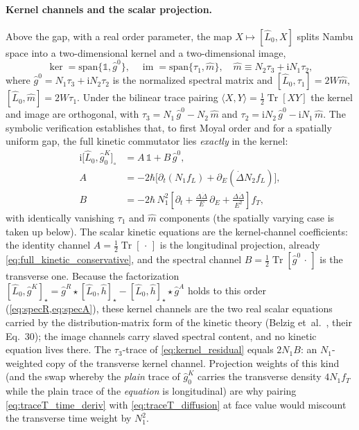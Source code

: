 \documentclass[
  aps,
  prb,
  preprint,
  superscriptaddress,
  longbibliography,
  nofootinbib
]{revtex4-2}
\newcommand{\ii}{\mathrm{i}}
\newcommand{\Tr}{\operatorname{Tr}}
\newcommand{\DOS}{N_1}
\newcommand{\fL}{f_L}
\newcommand{\fT}{f_T}
\newcommand{\hatg}{\hat{g}}
\providecommand{\openone}{}\renewcommand{\openone}{\mathds{1}}
\begin{document}
\paragraph{Kernel channels and the scalar projection.}
Above the gap, with a real order parameter, the map
\(X\mapsto[\hat L_0,X]\) splits Nambu space into a two-dimensional kernel
and a two-dimensional image,
\begin{equation}
  \ker=\mathrm{span}\{\openone,\hatg^0\},
  \quad
  \operatorname{im}=\mathrm{span}\{\tau_1,\hat m\},
  \quad
  \hat m\equiv N_2\tau_3+\ii\DOS\tau_2,
  \label{eq:kernel_channels}
\end{equation}
where \(\hatg^0=\DOS\tau_3+\ii N_2\tau_2\) is the normalized spectral
matrix and \([\hat L_0,\tau_1]=2W\hat m\), \([\hat L_0,\hat m]=2W\tau_1\).
Under the bilinear trace pairing \(\langle X,Y\rangle=\tfrac12\Tr[XY]\)
the kernel and image are orthogonal, with
\(\tau_3=\DOS\,\hatg^0-N_2\,\hat m\) and
\(\tau_2=\ii N_2\,\hatg^0-\ii\DOS\,\hat m\). The symbolic verification
establishes that, to first Moyal order and for a spatially uniform gap,
the full kinetic commutator lies \emph{exactly} in the kernel:
\begin{equation}
\begin{aligned}
  \ii\bigl[\hat L_0,\hatg_0^{K}\bigr]_{\circ}
  &=
  A\,\openone+B\,\hatg^0,
  \\
  A&=-2\hbar\bigl[\partial_t(\DOS\fL)+\partial_E(\dot\Delta N_2\fL)\bigr],
  \\
  B&=-2\hbar\,\DOS^2
  \left[\partial_t
  +\frac{\Delta\dot\Delta}{E}\,\partial_E
  +\frac{\Delta\dot\Delta}{E^{2}}\right]\fT ,
\end{aligned}
  \label{eq:kernel_residual}
\end{equation}
with identically vanishing \(\tau_1\) and \(\hat m\) components (the
spatially varying case is taken up below). The scalar kinetic equations
are the kernel-channel coefficients: the identity channel
\(A=\tfrac12\Tr[\,\cdot\,]\) is the longitudinal projection, already
\cref{eq:full_kinetic_conservative}, and the spectral channel
\(B=\tfrac12\Tr[\hatg^0\,\cdot\,]\) is the transverse one. Because the
factorization
\([\hat L_0,\hatg^K]_\star
=\hatg^R\star[\hat L_0,\hat h]_\star-[\hat L_0,\hat h]_\star\star\hatg^A\)
holds to this order (\cref{eq:specR,eq:specA}), these kernel channels are
the two real scalar equations carried by the distribution-matrix form of
the kinetic theory (Belzig et~al.~\cite{belzig1999}, their Eq.~30); the
image channels carry slaved spectral content, and no kinetic equation
lives there. The \(\tau_3\)-trace of \cref{eq:kernel_residual} equals
\(2\DOS B\): an \(\DOS\)-weighted copy of the transverse kernel channel.
Projection weights of this kind (and the swap whereby the \emph{plain}
trace of \(\hatg_0^K\) carries the transverse density \(4\DOS\fT\) while
the plain trace of the \emph{equation} is longitudinal) are why pairing
\cref{eq:traceT_time_deriv} with \cref{eq:traceT_diffusion} at face value
would miscount the transverse time weight by \(\DOS^{2}\).
\end{document}
